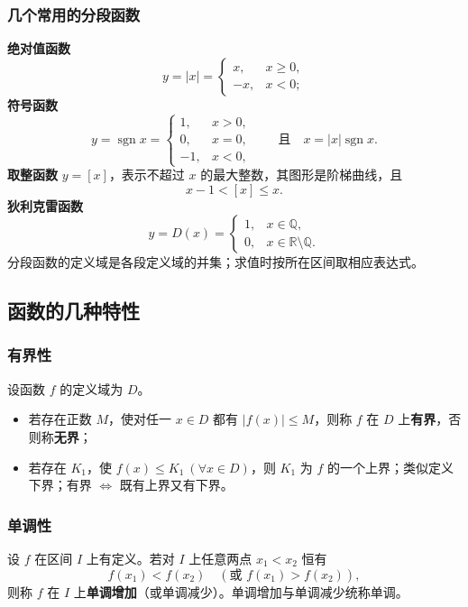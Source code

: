 \subsubsection{几个常用的分段函数}
\textbf{绝对值函数}
\[
y=|x|=\begin{cases}x, & x\ge 0,\\ -x, & x<0;\end{cases}
\]
\textbf{符号函数}
\[
y=\operatorname{sgn}x=\begin{cases}1, & x>0,\\ 0, & x=0,\\ -1, & x<0,\end{cases}
\qquad \text{且}\quad x=|x|\operatorname{sgn}x .
\]
\textbf{取整函数} $y=[x]$，表示不超过 $x$ 的最大整数，其图形是阶梯曲线，且
\[
x-1<[x]\le x .
\]
\textbf{狄利克雷函数}
\[
y=D(x)=\begin{cases}1, & x\in\mathbb{Q},\\ 0, & x\in\mathbb{R}\setminus\mathbb{Q}.\end{cases}
\]
分段函数的定义域是各段定义域的并集；求值时按所在区间取相应表达式。

\subsection{函数的几种特性}

\subsubsection{有界性}
设函数 $f$ 的定义域为 $D$。
\begin{itemize}
    \item 若存在正数 $M$，使对任一 $x\in D$ 都有 $|f(x)|\le M$，则称 $f$ 在 $D$ 上\textbf{有界}，否则称\textbf{无界}；
    \item 若存在 $K_1$，使 $f(x)\le K_1\ (\forall x\in D)$，则 $K_1$ 为 $f$ 的一个上界；类似定义下界；有界 $\iff$ 既有上界又有下界。
\end{itemize}


\subsubsection{单调性}
设 $f$ 在区间 $I$ 上有定义。若对 $I$ 上任意两点 $x_1<x_2$ 恒有
\[
f(x_1)<f(x_2)\quad(\text{或 }f(x_1)>f(x_2)),
\]
则称 $f$ 在 $I$ 上\textbf{单调增加}（或单调减少）。单调增加与单调减少统称单调。

